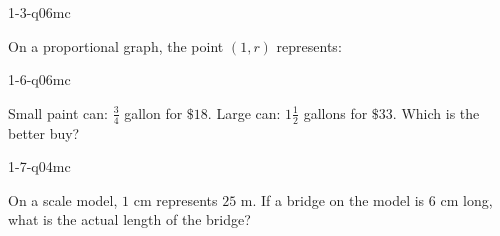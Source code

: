 \documentclass[12pt, fleqn, openany]{studyGuide}
\begin{document}
\renewcommand{\VMBookTitle}{5 Full-Length Oklahoma OSTP Grade 7 Math Practice Tests}
\renewcommand{\VMBookSubtitle}{Extra Practice for Test Day Success}
\renewcommand{\VMFooterURL}{https://viewmath.com/grade7}
\renewcommand{\VMFooterURLDisplay}{ViewMath.com/Grade7}






\tableofcontents
\cleardoublepage
{}


\begin{practiceQuestion}{1-3-q06}{mc}
\begin{questionText}
On a proportional graph, the point $(1, r)$ represents:
\end{questionText}
\end{practiceQuestion}

\begin{practiceQuestion}{1-6-q06}{mc}
\begin{questionText}
Small paint can: $\frac{3}{4}$ gallon for $\$18$. Large can: $1\frac{1}{2}$ gallons for $\$33$. Which is the better buy?
\end{questionText}
\end{practiceQuestion}

\begin{practiceQuestion}{1-7-q04}{mc}
\begin{questionText}
On a scale model, $1$ cm represents $25$ m. If a bridge on the model is $6$ cm long, what is the actual length of the bridge?
\end{questionText}
\end{practiceQuestion}
\end{document}
